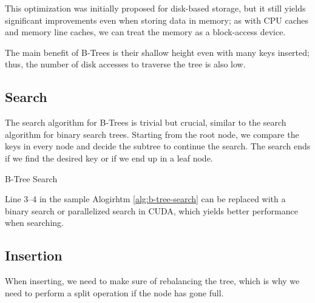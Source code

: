 This optimization was initially proposed for disk-based storage, but it still yields significant improvements even when storing data in memory; as with CPU caches and memory line caches, we can treat the memory as a block-access device.

The main benefit of B-Trees is their shallow height even with many keys inserted; thus, the number of disk accesses to traverse the tree is also low.

\subsection{Search}

The search algorithm for B-Trees is trivial but crucial, similar to the search algorithm for binary search trees. Starting from the root node, we compare the keys in every node and decide the subtree to continue the search. The search ends if we find the desired key or if we end up in a leaf node.

\begin{algorithm}
  \caption{B-Tree Search}\label{alg:b-tree-search}
  \DontPrintSemicolon


\end{algorithm}

Line 3--4 in the sample Alogirhtm \ref{alg:b-tree-search} can be replaced with a binary search or parallelized search in CUDA, which yields better performance when searching.

\subsection{Insertion}

When inserting, we need to make sure of rebalancing the tree, which is why we need to perform a split operation if the node has gone full.

